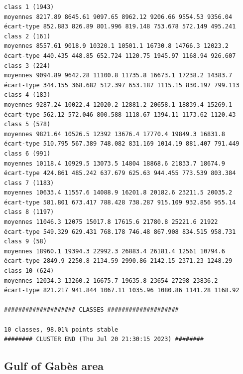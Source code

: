 \documentclass[land,article,submit,pdftex,moreauthors]{Definitions/mdpi}
\begin{document}
\begin{scriptsize}
\begin{verbatim}
class 1 (1943)
moyennes 8217.89 8645.61 9097.65 8962.12 9206.66 9554.53 9356.04
écart-type 852.883 826.89 801.996 819.148 753.678 572.149 495.241
class 2 (161)
moyennes 8557.61 9018.9 10320.1 10501.1 16730.8 14766.3 12023.2
écart-type 440.435 448.85 652.724 1120.75 1945.97 1168.94 926.607
class 3 (224)
moyennes 9094.89 9642.28 11100.8 11735.8 16673.1 17238.2 14383.7
écart-type 344.155 368.682 512.397 653.187 1115.15 830.197 799.113
class 4 (183)
moyennes 9287.24 10022.4 12020.2 12881.2 20658.1 18839.4 15269.1
écart-type 562.12 572.046 800.588 1118.67 1394.11 1173.62 1120.43
class 5 (578)
moyennes 9821.64 10526.5 12392 13676.4 17770.4 19849.3 16831.8
écart-type 510.795 567.389 748.082 831.169 1014.19 881.407 791.449
class 6 (991)
moyennes 10118.4 10929.5 13073.5 14804 18868.6 21833.7 18674.9
écart-type 424.861 485.242 637.679 625.63 944.455 773.539 803.384
class 7 (1183)
moyennes 10633.4 11557.6 14088.9 16201.8 20182.6 23211.5 20035.2
écart-type 581.801 673.417 788.428 738.287 915.109 932.856 955.14
class 8 (1197)
moyennes 11046.3 12075 15017.8 17615.6 21780.8 25221.6 21922
écart-type 549.329 629.431 768.178 746.48 867.908 834.515 958.731
class 9 (58)
moyennes 18960.1 19394.3 22992.3 26883.4 26181.4 12561 10794.6
écart-type 2849.9 2250.8 2134.59 2990.86 2142.15 2371.23 1248.29
class 10 (624)
moyennes 12034.3 13260.2 16675.7 19635.8 23654 27298 23836.2
écart-type 821.217 941.844 1067.11 1035.96 1080.86 1141.28 1168.92

#################### CLASSES ####################

10 classes, 98.01% points stable
######## CLUSTER END (Thu Jul 20 21:30:15 2023) ########
\end{verbatim}
\end{scriptsize}

\subsection[\appendixname~\thesubsection]{Gulf of Gabès area}
\end{document}
